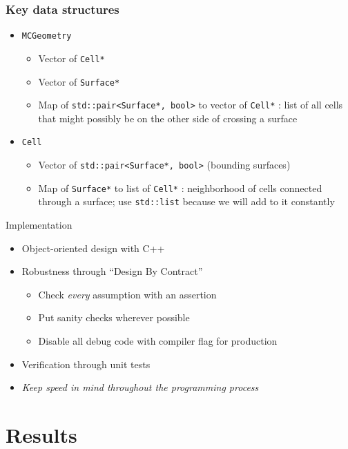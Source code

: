 \documentclass{beamer}
\begin{document}
\begin{frame}
\frametitle{Key data structures}
\begin{itemize}
  \item \texttt{MCGeometry}
    \begin{itemize}
      \item Vector of \texttt{Cell*}
      \item Vector of \texttt{Surface*}
      \item Map of \texttt{std::pair<Surface*, bool>} to 
        vector of \texttt{Cell*} : list of all cells that might possibly be on
        the other side of crossing a surface
    \end{itemize}
  \item \texttt{Cell}
    \begin{itemize}
      \item Vector of \texttt{std::pair<Surface*, bool>} (bounding surfaces)
      \item Map of \texttt{Surface*} to list of \texttt{Cell*} : 
        neighborhood of cells connected through a surface; use
        \texttt{std::list} because we will add to it constantly
    \end{itemize}
\end{itemize}
\end{frame}
\begin{frame}{Implementation}
\begin{itemize}
  \item Object-oriented design with C++
  \item Robustness through ``Design By Contract''
    \begin{itemize}
      \item Check \emph{every} assumption with an assertion
      \item Put sanity checks wherever possible
      \item Disable all debug code with compiler flag for production
    \end{itemize}
  \item Verification through unit tests
  \item \emph{Keep speed in mind throughout the programming process}
\end{itemize}
\end{frame}


\section{Results}
\end{document}
